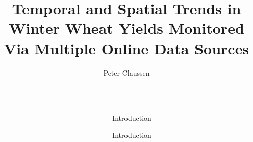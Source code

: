\documentclass[final]{beamer}
\title{Temporal and Spatial Trends in Winter Wheat Yields Monitored Via Multiple Online Data Sources} %
\author{Peter Claussen} %
\institute{Gylling Data Management} %
\newlength{\sepwid}
\newlength{\onecolwid}
\begin{document}

\setlength{\belowcaptionskip}{2ex} %
\setlength\belowdisplayshortskip{2ex} %

\begin{frame}[t] %

\begin{columns}[t] %

\begin{column}{\sepwid}\end{column} %

\begin{column}{\onecolwid} %


\begin{alertblock}{Introduction}

\end{alertblock}


\begin{block}{Introduction}



\end{block}
\end{column}
\end{columns}
\end{frame}
\end{document}

